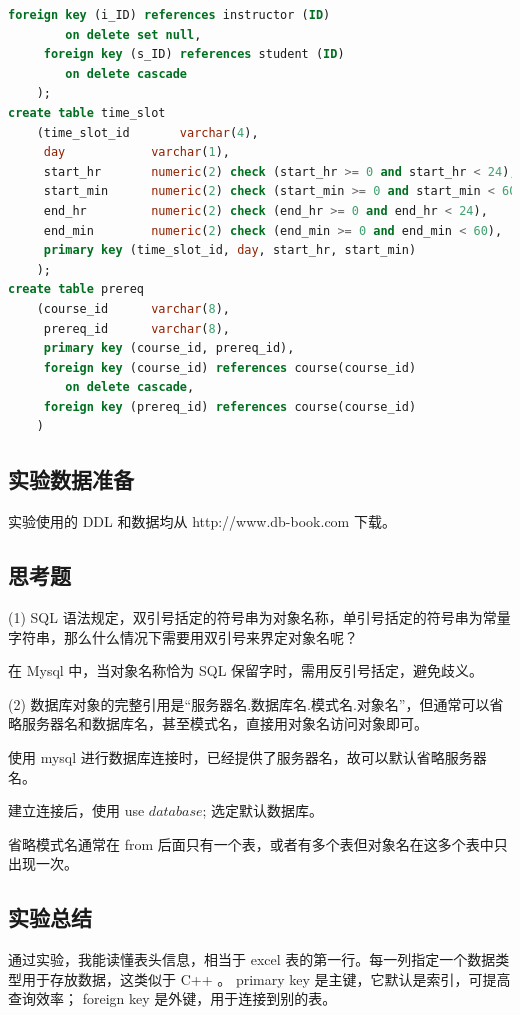 \documentclass{article}
\begin{document}
\begin{lstlisting}[language=sql]
	 foreign key (i_ID) references instructor (ID)
		on delete set null,
	 foreign key (s_ID) references student (ID)
		on delete cascade
	);
create table time_slot
	(time_slot_id		varchar(4),
	 day			varchar(1),
	 start_hr		numeric(2) check (start_hr >= 0 and start_hr < 24),
	 start_min		numeric(2) check (start_min >= 0 and start_min < 60),
	 end_hr			numeric(2) check (end_hr >= 0 and end_hr < 24),
	 end_min		numeric(2) check (end_min >= 0 and end_min < 60),
	 primary key (time_slot_id, day, start_hr, start_min)
	);
create table prereq
	(course_id		varchar(8), 
	 prereq_id		varchar(8),
	 primary key (course_id, prereq_id),
	 foreign key (course_id) references course(course_id)
		on delete cascade,
	 foreign key (prereq_id) references course(course_id)
	)
\end{lstlisting}

\subsection{实验数据准备}

实验使用的 DDL 和数据均从 http://www.db-book.com 下载。

\subsection{思考题}

(1) SQL 语法规定，双引号括定的符号串为对象名称，单引号括定的符号串为常量字符串，那么什么情况下需要用双引号来界定对象名呢？

在 Mysql 中，当对象名称恰为 SQL 保留字时，需用反引号括定，避免歧义。

(2) 数据库对象的完整引用是“服务器名.数据库名.模式名.对象名”，但通常可以省略服务器名和数据库名，甚至模式名，直接用对象名访问对象即可。

使用 mysql 进行数据库连接时，已经提供了服务器名，故可以默认省略服务器名。

建立连接后，使用 use $database$; 选定默认数据库。

省略模式名通常在 from 后面只有一个表，或者有多个表但对象名在这多个表中只出现一次。

\subsection{实验总结}

通过实验，我能读懂表头信息，相当于 excel 表的第一行。每一列指定一个数据类型用于存放数据，这类似于 C++ 。 primary key 是主键，它默认是索引，可提高查询效率； foreign key 是外键，用于连接到别的表。
\end{document}

